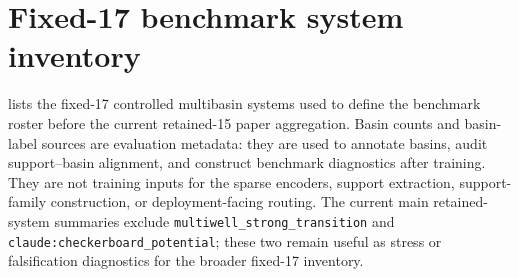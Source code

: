 \section{Fixed-17 benchmark system inventory}
\label{sec:supp_table_a2_fixed17_inventory}

 lists the fixed-17 controlled multibasin
systems used to define the benchmark roster before the current retained-15
paper aggregation. Basin counts and basin-label sources are evaluation
metadata: they are used to annotate basins, audit support--basin alignment, and
construct benchmark diagnostics after training. They are not training inputs
for the sparse encoders, support extraction, support-family construction, or
deployment-facing routing. The current main retained-system summaries exclude
\texttt{multiwell\_strong\_transition} and
\texttt{claude:checkerboard\_potential}; these two remain useful as stress or
falsification diagnostics for the broader fixed-17 inventory.

